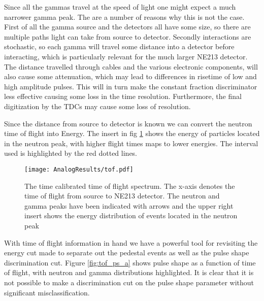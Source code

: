 \documentclass[main.tex]{subfiles}
\begin{document}
Since all the gammas travel at the speed of light one might expect a much narrower gamma peak. The are a number of reasons why this is not the case. First of all the gamma source and the detectors all have some size, so there are multiple paths light can take from source to detector. Secondly interactions are stochastic, so each gamma will travel some distance into a detector before interacting, which is particularly relevant for the much larger NE213 detector. The distance travelled through cables and the various electronic components, will also cause some attenuation, which may lead to differences in risetime of low and high amplitude pulses. This will in turn make the constant fraction discriminator less effective causing some loss in the time resolution. Furthermore, the final  digitization by the TDCs may cause some loss of resolution.

Since the distance from source to detector is known we can convert the neutron time of flight into Energy. The insert in fig \ref{fig:tof_a} shows the energy of particles located in the neutron peak, with higher flight times maps to lower energies. The interval used is highlighted by the red dotted lines.
\begin{figure}[ht]
    \centering
        \texttt{[image: AnalogResults/tof.pdf]}
        \caption{The time calibrated time of flight spectrum. The x-axis denotes the time of flight from source to NE213 detector. The neutron and gamma peaks have been indicated with arrows and the upper right insert shows the energy distribution of events located in the neutron peak}
    \label{fig:tof_a}
\end{figure}

With time of flight information in hand we have a powerful tool for revisiting the energy cut made to separate out the pedestal events as well as the pulse shape discrimination cut. Figure \ref{fig:tof_ps_a} shows pulse shape as a function of time of flight, with neutron and gamma distributions highlighted. It is clear that it is not possible to make a discrimination cut on the pulse shape parameter without significant misclassification. 
\end{document}
